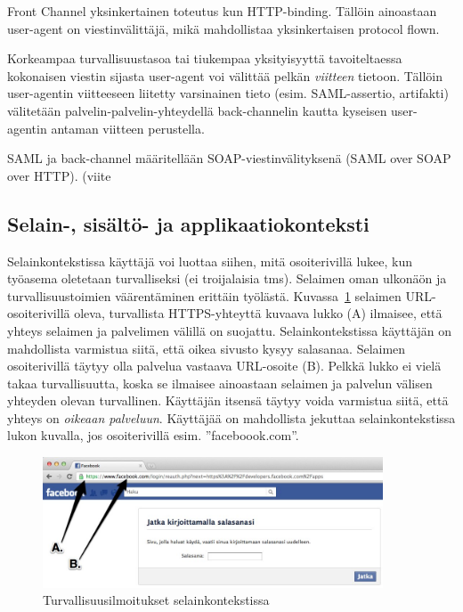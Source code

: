 \documentclass[finnish,gradu]{tktltiki}
\begin{document}
  Front Channel yksinkertainen toteutus kun HTTP-binding. Tällöin ainoastaan user-agent on viestinvälittäjä, mikä mahdollistaa yksinkertaisen protocol flown.

  Korkeampaa turvallisuustasoa tai tiukempaa yksityisyyttä tavoiteltaessa kokonaisen viestin sijasta user-agent voi välittää pelkän \emph{viitteen} tietoon. Tällöin user-agentin viitteeseen liitetty varsinainen tieto (esim. SAML-assertio, artifakti) välitetään palvelin-palvelin-yhteydellä back-channelin kautta kyseisen user-agentin antaman viitteen perustella.

  SAML ja back-channel määritellään SOAP-viestinvälityksenä (SAML over SOAP over HTTP).
  (viite %



  \subsection{Selain-, sisältö- ja applikaatiokonteksti} %
  \label{sub:selainkonteksti_vs_applikaatiokonteksti}

  Selainkontekstissa käyttäjä voi luottaa siihen, mitä osoiterivillä lukee, kun työasema oletetaan turvalliseksi (ei troijalaisia tms). Selaimen oman ulkonäön ja turvallisuustoimien väärentäminen erittäin työlästä. Kuvassa~\ref{fig:facebook_reauth_ab} selaimen URL-osoiterivillä oleva, turvallista HTTPS-yhteyttä kuvaava lukko (A) ilmaisee, että yhteys selaimen ja palvelimen välillä on suojattu. Selainkontekstissa käyttäjän on mahdollista varmistua siitä, että oikea sivusto kysyy salasanaa. Selaimen osoiterivillä täytyy olla palvelua vastaava URL-osoite (B). Pelkkä lukko ei vielä takaa turvallisuutta, koska se ilmaisee ainoastaan selaimen ja palvelun välisen yhteyden olevan turvallinen. Käyttäjän itsensä täytyy voida varmistua siitä, että yhteys on \emph{oikeaan palveluun}. Käyttäjää on mahdollista jekuttaa selainkontekstissa lukon kuvalla, jos osoiterivillä esim. ''faceboook.com''.

  \begin{figure}
    \centering
    \includegraphics[width=0.9\textwidth]{images/Facebook_reauth_ab.jpg}
    \caption{Turvallisuusilmoitukset selainkontekstissa}
    \label{fig:facebook_reauth_ab}
  \end{figure}
\end{document}
